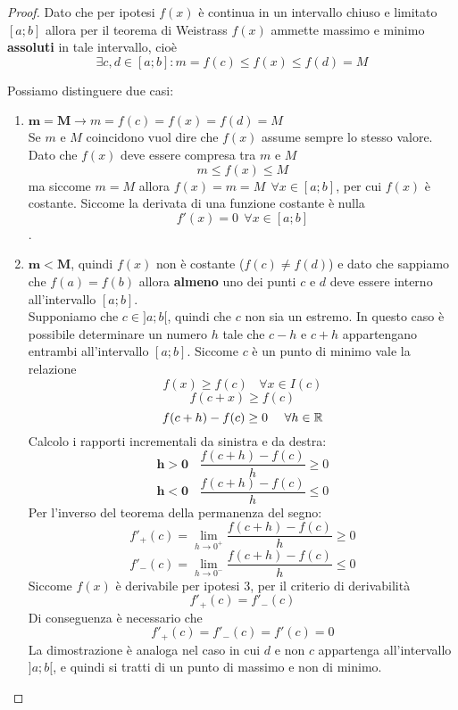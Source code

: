 \documentclass{article}     %
\begin{document}
        \begin{proof}
        Dato che per ipotesi $f(x)$ è continua in un intervallo chiuso e limitato $[a;b]$ allora per il teorema di Weistrass $f(x)$ ammette massimo e minimo \textbf{assoluti} in tale intervallo, cioè \[\exists c,d \in [a;b] : m=f(c)\leq f(x)\leq f(d) = M\]
        \begin{figure}
            \centering
        \end{figure}
        Possiamo distinguere due casi:
        \begin{enumerate}
            \item $\mathbf{m=M}\to m=f(c)= f(x)= f(d) = M$\\
            Se $m$ e $M$ coincidono vuol dire che $f(x)$ assume sempre lo stesso valore. Dato che $f(x)$ deve essere compresa tra $m$ e $M$\[m\leq f(x) \leq M\]
            ma siccome $m=M$ allora $f(x)=m=M ~~\forall x \in [a;b]$, per cui $f(x)$ è costante. Siccome la derivata di una funzione costante è nulla \[f'(x)=0~~\forall x \in [a;b]\].
            \item $\mathbf{m<M}$, quindi $f(x)$ non è costante ($f(c)\neq f(d)$) e dato che sappiamo che $f(a)=f(b)$ allora \textbf{almeno} uno dei punti $c$ e $d$ deve essere interno all'intervallo $[a;b]$.\\ Supponiamo che $c\in ]a;b[$, quindi che $c$ non sia un estremo. In questo caso è possibile determinare un numero $h$ tale che $c-h$ e $c+h$ appartengano entrambi all'intervallo $[a;b]$. Siccome $c$ è un punto di minimo vale la relazione 
            \[f(x) \geq f(c) ~~~~ \forall x \in I(c)\]
            \[f(c+x)\geq f(c)\]
            \[f(c+h)-f(c)\geq 0 ~~~~\forall h \in \mathbb{R}\]
            Calcolo i rapporti incrementali da sinistra e da destra:
            \[\mathbf{h>0}~~~~ \frac{f(c+h)-f(c)}{h}\geq 0\]
            \[\mathbf{h<0}~~~~ \frac{f(c+h)-f(c)}{h}\leq 0\]
            Per l'inverso del teorema della permanenza del segno:
            \[f'_+(c)=\lim_{h\to 0^+}\frac{f(c+h)-f(c)}{h}\geq 0\]
            \[f'_-(c)=\lim_{h\to 0^-}\frac{f(c+h)-f(c)}{h}\leq 0\]
            Siccome $f(x)$ è derivabile per ipotesi 3, per il criterio di derivabilità
            \[f'_+(c)=f'_-(c)\]
            Di conseguenza è necessario che \[f'_+(c)=f'_-(c)=f'(c)=0\]
            La dimostrazione è analoga nel caso in cui $d$ e non $c$ appartenga all'intervallo $]a;b[$, e quindi si tratti di un punto di massimo e non di minimo.
        \end{enumerate}
        \end{proof}
\end{document}
